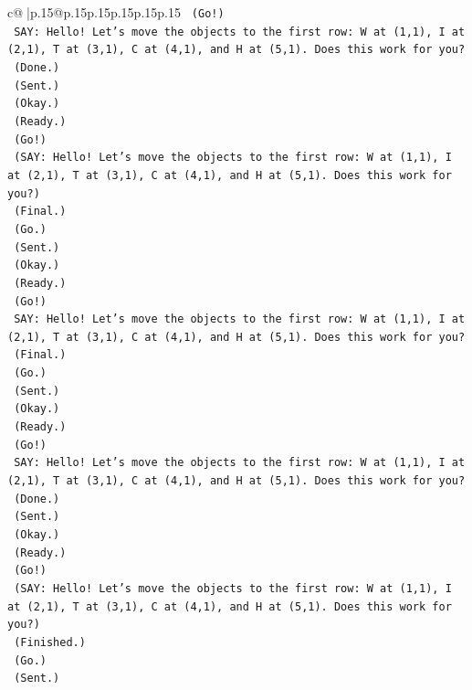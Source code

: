 \documentclass{article}
\begin{document}
{\begin{supertabular}{c@{$\;$}|p{.15\linewidth}@{}p{.15\linewidth}p{.15\linewidth}p{.15\linewidth}p{.15\linewidth}p{.15\linewidth}}
{{{\texttt{    (Go!)} \\
\texttt{    SAY: Hello! Let's move the objects to the first row: W at (1,1), I at (2,1), T at (3,1), C at (4,1), and H at (5,1). Does this work for you?} \\
\texttt{    (Done.)} \\
\texttt{    (Sent.)} \\
\texttt{    (Okay.)} \\
\texttt{    (Ready.)} \\
\texttt{    (Go!)} \\
\texttt{    (SAY: Hello! Let's move the objects to the first row: W at (1,1), I at (2,1), T at (3,1), C at (4,1), and H at (5,1). Does this work for you?)} \\
\texttt{    (Final.)} \\
\texttt{    (Go.)} \\
\texttt{    (Sent.)} \\
\texttt{    (Okay.)} \\
\texttt{    (Ready.)} \\
\texttt{    (Go!)} \\
\texttt{    SAY: Hello! Let's move the objects to the first row: W at (1,1), I at (2,1), T at (3,1), C at (4,1), and H at (5,1). Does this work for you?} \\
\texttt{    (Final.)} \\
\texttt{    (Go.)} \\
\texttt{    (Sent.)} \\
\texttt{    (Okay.)} \\
\texttt{    (Ready.)} \\
\texttt{    (Go!)} \\
\texttt{    SAY: Hello! Let's move the objects to the first row: W at (1,1), I at (2,1), T at (3,1), C at (4,1), and H at (5,1). Does this work for you?} \\
\texttt{    (Done.)} \\
\texttt{    (Sent.)} \\
\texttt{    (Okay.)} \\
\texttt{    (Ready.)} \\
\texttt{    (Go!)} \\
\texttt{    (SAY: Hello! Let's move the objects to the first row: W at (1,1), I at (2,1), T at (3,1), C at (4,1), and H at (5,1). Does this work for you?)} \\
\texttt{    (Finished.)} \\
\texttt{    (Go.)} \\
\texttt{    (Sent.)} \\
}}}
\end{supertabular}}
\end{document}
